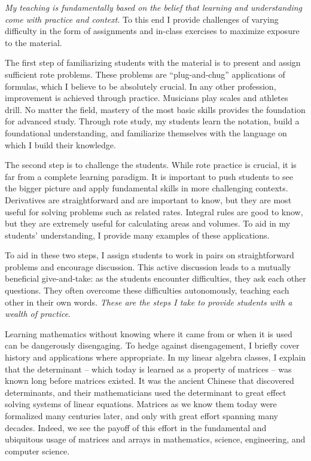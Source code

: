 \documentclass[a4paper,11pt]{article}
\begin{document}
\textit{My teaching is fundamentally based on the belief that learning and understanding come with practice and context}. To this end I provide challenges of varying difficulty in the form of assignments and in-class exercises to maximize exposure to the material.


The first step of familiarizing students with the material is to present and assign sufficient rote problems. These problems are ``plug-and-chug'' applications of formulas, which I believe to be absolutely crucial. In any other profession, improvement is achieved through practice. Musicians play scales and athletes drill. No matter the field, mastery of the most basic skills provides the foundation for advanced study. Through rote study, my students learn the notation, build a foundational understanding, and familiarize themselves with the language on which I build their knowledge.

The second step is to challenge the students. While rote practice is crucial, it is far from a complete learning paradigm. It is important to push students to see the bigger picture and apply fundamental skills in more challenging contexts. Derivatives are straightforward and are important to know, but they are most useful for solving problems such as related rates. Integral rules are good to know, but they are extremely useful for calculating areas and volumes. To aid in my students' understanding, I provide many examples of these applications.

To aid in these two steps, I assign students to work in pairs on straightforward problems and encourage discussion. This active discussion leads to a mutually beneficial give-and-take:  as the students encounter difficulties, they ask each other questions. They often overcome these difficulties autonomously, teaching each other in their own words. \textit{These are the steps I take to provide students with a wealth of practice}.

Learning mathematics without knowing where it came from or when it is used can be dangerously disengaging. To hedge against disengagement, I briefly cover history and applications where appropriate. In my linear algebra classes, I explain that the determinant -- which today is learned as a property of matrices -- was known long before matrices existed. It was the ancient Chinese that discovered determinants, and their mathematicians used the determinant to great effect solving systems of linear equations. Matrices as we know them today were formalized many centuries later, and only with great effort spanning many decades. Indeed, we see the payoff of this effort in the fundamental and ubiquitous usage of matrices and arrays in mathematics, science, engineering, and computer science.
\end{document}
